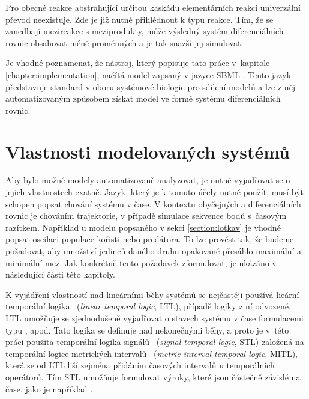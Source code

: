 Pro obecné reakce abstrahující určitou kaskádu elementárních reakcí univerzální
převod neexistuje. Zde je již nutné přihlédnout k typu reakce. Tím, že se
zanedbají mezireakce s meziprodukty, může výsledný systém diferenciálních rovnic obsahovat
méně proměnných a je tak snazší jej simulovat.

Je vhodné poznamenat, že nástroj, který popisuje tato práce v~kapitole \ref{chapter:implementation},
načítá model zapsaný v jazyce SBML \cite{hucka2003,drager2011}. Tento jazyk představuje standard
v oboru systémové biologie pro sdílení modelů a lze z něj automatizovaným způsobem získat model
ve formě systému diferenciálních rovnic.

\section{Vlastnosti modelovaných systémů}

Aby bylo možné modely automatizovaně analyzovat, je nutné vyjadřovat se o jejich
vlastnostech exatně. Jazyk, který je k tomuto účely nutné použít, musí být schopen 
popsat chování systému v čase. V kontextu obyčejných a di\-fe\-ren\-ci\-ál\-ních rovnic je
chováním trajektorie, v případě simulace sekvence bodů s~časovým razítkem. Například u modelu
popsaného v sekci \ref{section:lotkav} je vhodné popsat oscilaci populace kořisti
nebo predátora. To lze provést tak, že budeme požadovat, aby množství jedinců
daného druhu opakovaně pře\-sáh\-lo maximální a minimální mez. Jak konkrétně
tento po\-ža\-da\-vek zformulovat, je ukázáno v následující části této kapitoly.

K vyjádření vlastností nad lineárními běhy systémů se nejčastěji používá lieární
temporální logika~\cite{strejcek2007} (\textit{linear temporal logic}, LTL), případě logiky z ní odvozené.
LTL u\-mož\-ňu\-je se zjednodušeně vyjadřovat o sta\-vech
systému v čase formulacemi typu ,  apod.
Tato logika se definuje nad nekonečnými běhy, a proto je v~této práci použita temporální logika
signálů~\cite{maler2004} (\textit{signal temporal logic}, STL) založená na temporální logice metrických intervalů~\cite{alur1996} (\textit{metric interval temporal logic}, MITL),
která se od LTL liší zejména přidáním ča\-so\-vých intervalů u temporálních operátorů. Tím STL
u\-mož\-ňu\-je formulovat výroky, které jsou částečně zá\-vis\-lé na čase, jako
je například  .

